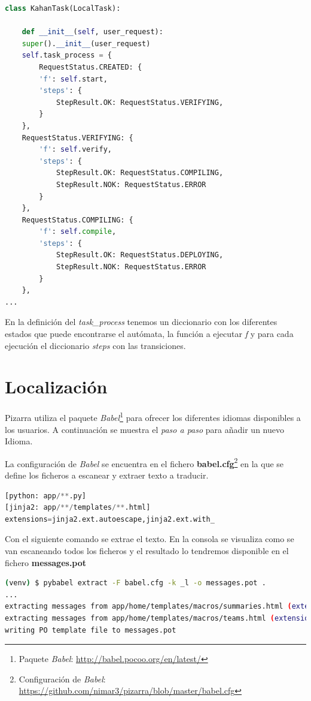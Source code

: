 \documentclass[11pt,spanish,listoffigures,listoftables]{tfgetsinf}
\begin{document}
\begin{lstlisting}[language=python]
class KahanTask(LocalTask):

	def __init__(self, user_request):
	super().__init__(user_request)
	self.task_process = {
		RequestStatus.CREATED: {
		'f': self.start,
		'steps': {
			StepResult.OK: RequestStatus.VERIFYING,
		}
	},
	RequestStatus.VERIFYING: {
		'f': self.verify,
		'steps': {
			StepResult.OK: RequestStatus.COMPILING,
			StepResult.NOK: RequestStatus.ERROR
		}
	},
	RequestStatus.COMPILING: {
		'f': self.compile,
		'steps': {
			StepResult.OK: RequestStatus.DEPLOYING,
			StepResult.NOK: RequestStatus.ERROR
		}
	},
...
\end{lstlisting}

En la definición del \textit{task\_process} tenemos un diccionario con los diferentes estados que puede encontrarse el autómata, la función a ejecutar \textit{f} y para cada ejecución el diccionario \textit{steps} con las transiciones.

\section{Localización}

Pizarra utiliza el \Gls{paquete} \textit{Babel}\footnote{Paquete \textit{Babel}: \url{http://babel.pocoo.org/en/latest/}} para ofrecer los diferentes idiomas disponibles a los usuarios. A continuación se muestra el \textit{paso a paso} para añadir un nuevo Idioma.

La configuración de \textit{Babel} se encuentra en el fichero \textbf{babel.cfg}\footnote{Configuración de \textit{Babel}: \url{https://github.com/nimar3/pizarra/blob/master/babel.cfg}} en la que se define los ficheros a escanear y extraer texto a traducir.

\begin{lstlisting}[language=python]
[python: app/**.py]
[jinja2: app/**/templates/**.html]
extensions=jinja2.ext.autoescape,jinja2.ext.with_
\end{lstlisting}

Con el siguiente comando se extrae el texto. En la consola se visualiza como se van escaneando todos los ficheros y el resultado lo tendremos disponible en el fichero \mbox{\textbf{messages.pot}} 

\begin{lstlisting}[language=bash]
(venv) $ pybabel extract -F babel.cfg -k _l -o messages.pot .
...
extracting messages from app/home/templates/macros/summaries.html (extensions="jinja2.ext.autoescape,jinja2.ext.with_")
extracting messages from app/home/templates/macros/teams.html (extensions="jinja2.ext.autoescape,jinja2.ext.with_")
writing PO template file to messages.pot
\end{lstlisting}
\end{document}
